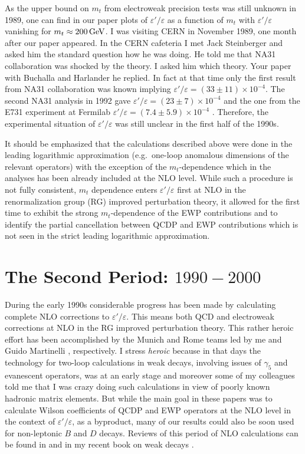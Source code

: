 \documentclass[12pt,a4paper]{article}
\newcommand{\gev}{\, {\rm GeV}}
\def\epe{\varepsilon'/\varepsilon}
\begin{document}
As the upper bound on $m_t$ from electroweak precision tests was still
unknown in 1989, one can find  in our paper plots of $\epe$ as a function
of $m_t$ with $\epe$ vanishing for $m_t\approx 200\gev$. I was visiting
CERN in November 1989, one month after our paper appeared. In the CERN
cafeteria  I met Jack Steinberger and asked him the standard question
how he was doing. He told me that NA31 collaboration was shocked by
the theory. I asked him which theory. Your paper with Buchalla and
Harlander he replied. In fact at that time only the first result from NA31
collaboration was known \cite{Burkhardt:1988yh} implying $\epe=(33\pm 11)\times 10^{-4}$. The second NA31 analysis in 1992 gave  $\epe=(23\pm 7)\times 10^{-4}$
\cite{Barr:1993rx} and
the one from the E731 experiment at Fermilab  $\epe=(7.4\pm 5.9)\times 10^{-4}$ \cite{Gibbons:1993zq}. Therefore, the experimental situation of $\epe$ was still unclear in the first half
of the 1990s.


It should be emphasized that the calculations described above 
were done in the leading logarithmic
approximation (e.g.\ one-loop anomalous dimensions of the relevant
operators) with the exception of the $m_t$-dependence which in 
the analyses  \cite{Flynn:1989iu,Buchalla:1989we,Paschos:1991as} has been already
included at the NLO level. While such a procedure is not fully
consistent, $m_t$ dependence enters $\epe$ first at NLO in the renormalization group (RG) improved 
perturbation theory, it allowed for the first time to exhibit the strong
$m_t$-dependence of the EWP contributions and to identify
the partial cancellation between QCDP and EWP contributions 
which is not seen in the strict leading logarithmic approximation.


\boldmath
\section{The Second Period: $1990-2000$}\label{P2}
\unboldmath
During the early 1990s considerable progress has been made by
calculating complete NLO corrections to $\epe$. This means both QCD and electroweak corrections at NLO in the RG improved perturbation theory. This rather heroic effort has been accomplished  by the  Munich and Rome teams led by me \cite{Buras:1991jm,Buras:1992tc,Buras:1992zv,Buras:1993dy} and Guido Martinelli \cite{Ciuchini:1992tj,Ciuchini:1993vr}, respectively. I stress
{\em heroic} because in that days the technology for two-loop calculations
in weak decays, involving issues of $\gamma_5$ and evanescent operators, was
at an early stage and moreover some of my colleagues told me that I was crazy
doing such calculations in view of poorly known hadronic matrix elements. But while the main goal in these papers was to calculate Wilson coefficients of
QCDP and EWP operators at the NLO level in the context of $\epe$, as a
byproduct, many  of our results could also be soon used for non-leptonic $B$ and $D$ decays.
Reviews of this period of
NLO calculations can be found in \cite{Buchalla:1995vs,Buras:2011we} and in my recent book on weak decays \cite{Buras:2020xsm}.
\end{document}
